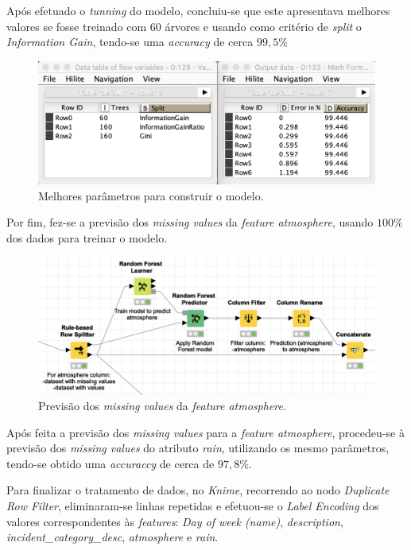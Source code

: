 \documentclass[a4paper, 12pt]{article}
\begin{document}
Após efetuado o \textit{tunning} do modelo, concluiu-se que este apresentava melhores valores se fosse treinado com $60$ árvores e usando como critério de \textit{split} o \textit{Information Gain}, tendo-se uma \textit{accuracy} de cerca $99,5\%$

\begin{figure}[H]
	\centering
	\includegraphics[width=15cm]{melhores_params}
	\caption{Melhores parâmetros para construir o modelo.}
\end{figure}

Por fim, fez-se a previsão dos \textit{missing values} da \textit{feature atmosphere}, usando $100\%$ dos dados para treinar o modelo.

\begin{figure}[H]
	\centering
	\includegraphics[width=15cm]{atmos}
	\caption{Previsão dos \textit{missing values} da \textit{feature atmosphere}.}
\end{figure}

Após feita a previsão dos \textit{missing values} para a \textit{feature atmosphere}, procedeu-se à previsão dos \textit{missing values} do atributo \textit{rain}, utilizando os mesmo parâmetros, tendo-se obtido uma \textit{accuraccy} de cerca de $97,8\%$.

Para finalizar o tratamento de dados, no \textit{Knime}, recorrendo ao nodo \textit{Duplicate Row Filter}, eliminaram-se linhas repetidas e efetuou-se o \textit{Label Encoding} dos valores correspondentes às \textit{features}: \textit{Day of week (name)}, \textit{description}, \textit{incident\_category\_desc}, \textit{atmosphere} e \textit{rain}. 
\end{document}
